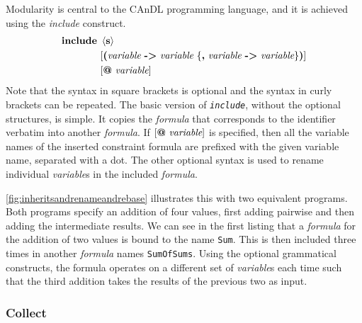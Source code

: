     Modularity is central to the CAnDL programming language, and it is achieved
    using the {\it include} construct.
    \begin{align*}
        \text{\bf include}\ &\left<\text{\bf s}\right>\\
                            &[\text{\bf (}\text{\it variable}\ \text{\bf ->}\ \text{\it variable}\ \{\text{\bf ,}\ \text{\it variable}\ \text{\bf ->}\ \text{\it variable}\}\text{\bf )}]\\
                            &[\text{\bf @}\ \text{\it variable}]
    \end{align*}
    Note that the syntax in square brackets is optional and the syntax in curly
    brackets can be repeated.
    The basic version of \texttt{\it include}, without the optional structures,
    is simple.
    It copies the {\it formula} that corresponds to the identifier verbatim into
    another {\it formula}.
    If $[\text{\bf @}\ \text{\it variable}]$ is specified, then all the variable
    names of the inserted constraint formula are prefixed with the given
    variable name, separated with a dot.
    The other optional syntax is used to rename individual {\it variable}s in
    the included {\it formula}.

    \autoref{fig:inheritsandrenameandrebase} illustrates this with two
    equivalent programs.
    Both programs specify an addition of four values, first adding pairwise and
    then adding the intermediate results.
    We can see in the first listing that a {\it formula} for the addition of two
    values is bound to the name {\tt Sum}.
    This is then included three times in another {\it formula} names
    {\tt SumOfSums}.
    Using the optional grammatical constructs, the formula operates on a
    different set of {\it variable}s each time such that the third addition
    takes the results of the previous two as input.

\begin{figure}[ht]

\label{fig:inheritsandrenameandrebase}
\end{figure}

\subsubsection{Collect}

